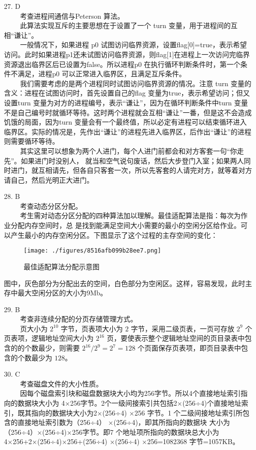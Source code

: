 27. D \\
$\qquad$ 考查进程间通信与Peterson 算法。\\
$\qquad$ 此算法实现互斥的主要思想在于设置了一个 turn 变量，用于进程间的互相“谦让”。\\
$\qquad$ 一般情况下，如果进程 p0 试图访问临界资源，设置flag[0]=true，表示希望访问。此时如果进程p1还未试图访问临界资源，则flag[1]在进程上一次访问完临界资源退出临界区后已设置为false。所以进程p0 在执行循环判断条件时，第一个条件不满足，进程p0 可以正常进入临界区，且满足互斥条件。\\
$\qquad$ 我们需要考虑的是两个进程同时试图访问临界资源的情况。注意 turn 变量的含义：进程在试图访问时，首先设置自己的flag 变量为true，表示希望访问；但又设置turn 变量为对方的进程编号，表示“谦让”，因为在循环判断条件中turn 变量不是自己编号时就循环等待。这时两个进程就会互相“谦让”一番，但是这不会造成饥饿的局面，因为turn 变量会有一个最终值，所以必定有进程可以结束循环进入临界区。实际的情况是，先作出“谦让”的进程先进入临界区，后作出“谦让”的进程则需要循环等待。\\
$\qquad$ 其实这里可以想象为两个人进门，每个人进门前都会和对方客套一句“你走先”。如果进门时没别人，
就当和空气说句废话，然后大步登门入室；如果两人同时进门，就互相请先，但各自只客套一次，所以先客套的人请完对方，就等着对方请自己，然后光明正大进门。

28. B \\
$\qquad$ 考查动态分区分配。\\
$\qquad$ 考生需对动态分区分配的四种算法加以理解。最佳适配算法是指：每次为作业分配内存空间时，总
是找到能满足空间大小需要的最小的空闲分区给作业。可以产生最小的内存空闲分区。下图显示了这个过程的主存空间的变化：
\begin{figure}[ht]
\centering
\texttt{[image: ./figures/8516afb099b28ee7.png]}
\caption{最佳适配算法分配示意图} \label{fig_CSN10_9}
\end{figure}
图中，灰色部分为分配出去的空间，白色部分为空闲区。这样，容易发现，此时主存中最大空闲分区的大小为9Mb。

29. B \\
$\qquad$ 考查非连续分配的分页存储管理方式。\\
$\qquad$ 页大小为 $2^{10}$ 字节，页表项大小为 $2$ 字节，采用二级页表，一页可存放 $2^9$ 个页表项，逻辑地址空间大小为 $2^{16}$ 页，要使表示整个逻辑地址空间的页目录表中包含的的个数最少，则需要 $2^{16}/2^9=2^7=128$ 个页面保存页表项，即页目录表中包含的个数最少为 $128$。

30. C \\
$\qquad$ 考查磁盘文件的大小性质。\\
$\qquad$ 因每个磁盘索引块和磁盘数据块大小均为256字节。所以4个直接地址索引指向的数据块大小为
4×256字节。2个一级间接索引共包括2×(256÷4)个直接地址索引，既其指向的数据块大小为2×(256÷4)
×256 字节。1 个二级间接地址索引所包含的直接地址索引数为（256÷4） ×(256÷4)，即其所指向的数据块
大小为（256÷4）×(256÷4)×256字节。即7 个地址项所指向的数据块总大小为4×256+2×(256÷4)×256+(256÷4) ×(256÷4) ×256=1082368 字节=1057KB。

